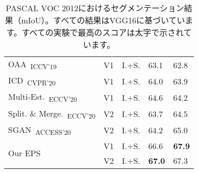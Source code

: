 \begin{table}[]
{\begin{tabular}{@{}lccll@{}}
\multicolumn{1}{l}{OAA~\cite{jiang2019integral}\textsubscript{ICCV'19}}                 & V1        & I.+S. & 63.1                    & 62.8                     \\
\multicolumn{1}{l}{ICD~\cite{fan2020learning}\textsubscript{CVPR'20}}                   & V1        & I.+S. & 64.0                    & 63.9                     \\
\multicolumn{1}{l}{Multi-Est.~\cite{fan2020employing}\textsubscript{ECCV'20}}           & V1        & I.+S. & 64.6                    & 64.2                     \\
\multicolumn{1}{l}{Split. \& Merge.~\cite{zhang2020splitting}\textsubscript{ECCV'20}}   & V2        & I.+S. & 63.7                    & 64.5                     \\
\multicolumn{1}{l}{SGAN~\cite{yao2020saliency}\textsubscript{ACCESS'20}}                & V2        & I.+S. & 64.2                    & 65.0                     \\ \midrule
\multicolumn{1}{l}{\multirow{2}{*}{Our EPS}}                                            & V1        & I.+S. & 66.6                    & \textbf{67.9}            \\
\multicolumn{1}{l}{}                                                                    & V2        & I.+S. & \textbf{67.0}           & 67.3                     \\ \bottomrule

\end{tabular}
}
\vspace{2mm}
\caption{PASCAL VOC 2012におけるセグメンテーション結果（mIoU）。すべての結果はVGG16に基づいています。すべての実験で最高のスコアは太字で示されています。}\vspace{-3mm}
\label{tab:seg_quan_voc_vgg16}
\end{table}
